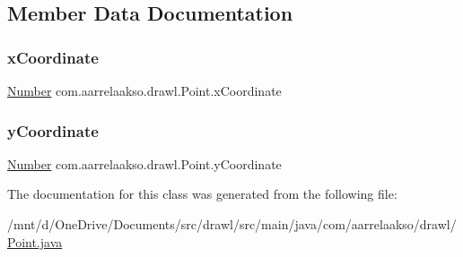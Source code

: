 \subsection{Member Data Documentation}
\mbox{\label{classcom_1_1aarrelaakso_1_1drawl_1_1_point_aa5144c5cca82c86f845bead6d4a51041}} 
\subsubsection{\texorpdfstring{x\+Coordinate}{xCoordinate}}
{\footnotesize\ttfamily \hyperlink{interfacecom_1_1aarrelaakso_1_1drawl_1_1_number}{Number} com.\+aarrelaakso.\+drawl.\+Point.\+x\+Coordinate\hspace{0.3cm}{\ttfamily [private]}}

\mbox{\label{classcom_1_1aarrelaakso_1_1drawl_1_1_point_ab84afea50a66677c32ed2fd3100838c7}} 
\subsubsection{\texorpdfstring{y\+Coordinate}{yCoordinate}}
{\footnotesize\ttfamily \hyperlink{interfacecom_1_1aarrelaakso_1_1drawl_1_1_number}{Number} com.\+aarrelaakso.\+drawl.\+Point.\+y\+Coordinate\hspace{0.3cm}{\ttfamily [private]}}



The documentation for this class was generated from the following file\+:\begin{DoxyCompactItemize}
\item 
/mnt/d/\+One\+Drive/\+Documents/src/drawl/src/main/java/com/aarrelaakso/drawl/\hyperlink{_point_8java}{Point.\+java}\end{DoxyCompactItemize}
